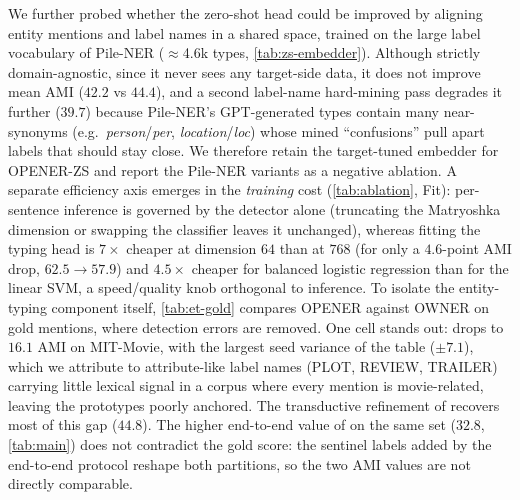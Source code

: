 We further probed whether the zero-shot head could be improved by aligning entity mentions and label names in a shared space, trained on the large label vocabulary of Pile-NER \cite{zhou2024universalner} ($\approx$4.6k types, \autoref{tab:zs-embedder}).
Although strictly domain-agnostic, since it never sees any target-side data, it does not improve mean AMI ($42.2$ vs $44.4$), and a second label-name hard-mining pass degrades it further ($39.7$) because Pile-NER's GPT-generated types contain many near-synonyms (e.g.\ \emph{person}/\emph{per}, \emph{location}/\emph{loc}) whose mined ``confusions'' pull apart labels that should stay close.
We therefore retain the target-tuned embedder for OPENER-ZS and report the Pile-NER variants as a negative ablation.
A separate efficiency axis emerges in the \emph{training} cost (\autoref{tab:ablation}, Fit): per-sentence inference is governed by the detector alone (truncating the Matryoshka dimension or swapping the classifier leaves it unchanged), whereas fitting the typing head is $7\times$ cheaper at dimension $64$ than at $768$ (for only a $4.6$-point AMI drop, $62.5\!\to\!57.9$) and $4.5\times$ cheaper for balanced logistic regression than for the linear SVM, a speed/quality knob orthogonal to inference.
To isolate the entity-typing component itself, \autoref{tab:et-gold} compares OPENER against OWNER on gold mentions, where detection errors are removed.
One cell stands out: \zsind drops to $16.1$ AMI on MIT-Movie, with the largest seed variance of the table ($\pm 7.1$), which we attribute to attribute-like label names (PLOT, REVIEW, TRAILER) carrying little lexical signal in a corpus where every mention is movie-related, leaving the prototypes poorly anchored. The transductive refinement of \zstr recovers most of this gap ($44.8$).
The higher end-to-end value of \zsind on the same set ($32.8$, \autoref{tab:main}) does not contradict the gold score: the sentinel labels added by the end-to-end protocol reshape both partitions, so the two AMI values are not directly comparable.

